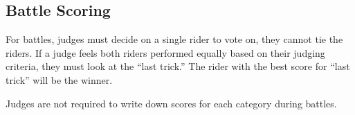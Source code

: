 \subsection{Battle Scoring}
For battles, judges must decide on a single rider to vote on, they cannot tie the riders.
If a judge feels both riders performed equally based on their judging criteria, they must look at the ``last trick.''
The rider with the best score for ``last trick'' will be the winner.

Judges are not required to write down scores for each category during battles.
